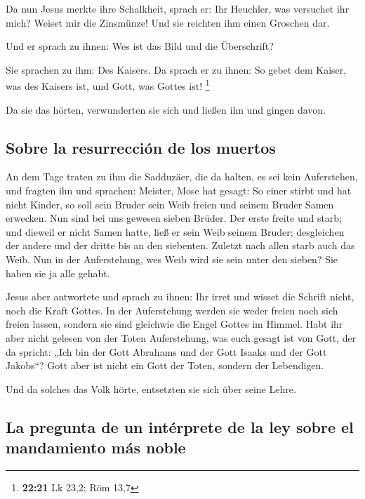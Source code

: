  Da nun Jesus merkte ihre Schalkheit, sprach er: Ihr
Heuchler, was versuchet ihr mich?  Weiset mir die
Zinsmünze! Und sie reichten ihm einen Groschen dar.

 Und er sprach zu ihnen: Wes ist das Bild und die
Überschrift?

 Sie sprachen zu ihm: Des Kaisers. Da sprach er zu ihnen:
So gebet dem Kaiser, was des Kaisers ist, und Gott, was Gottes ist!
\footnote{\textbf{22:21} Lk 23,2; Röm 13,7}

 Da sie das hörten, verwunderten sie sich und ließen ihn
und gingen davon.

\hypertarget{sobre-la-resurrecciuxf3n-de-los-muertos}{%
\subsection{Sobre la resurrección de los
muertos}\label{sobre-la-resurrecciuxf3n-de-los-muertos}}

 An dem Tage traten zu ihm die Sadduzäer, die da halten,
es sei kein Auferstehen, und fragten ihn  und sprachen:
Meister, Mose hat gesagt: So einer stirbt und hat nicht Kinder, so soll
sein Bruder sein Weib freien und seinem Bruder Samen erwecken.
 Nun sind bei uns gewesen sieben Brüder. Der erste freite
und starb; und dieweil er nicht Samen hatte, ließ er sein Weib seinem
Bruder;  desgleichen der andere und der dritte bis an den
siebenten.  Zuletzt nach allen starb auch das Weib.
 Nun in der Auferstehung, wes Weib wird sie sein unter
den sieben? Sie haben sie ja alle gehabt.

 Jesus aber antwortete und sprach zu ihnen: Ihr irret und
wisset die Schrift nicht, noch die Kraft Gottes.  In der
Auferstehung werden sie weder freien noch sich freien lassen, sondern
sie sind gleichwie die Engel Gottes im Himmel.  Habt ihr
aber nicht gelesen von der Toten Auferstehung, was euch gesagt ist von
Gott, der da spricht:  „Ich bin der Gott Abrahams und der
Gott Isaaks und der Gott Jakobs``? Gott aber ist nicht ein Gott der
Toten, sondern der Lebendigen.

 Und da solches das Volk hörte, entsetzten sie sich über
seine Lehre.

\hypertarget{la-pregunta-de-un-intuxe9rprete-de-la-ley-sobre-el-mandamiento-muxe1s-noble}{%
\subsection{La pregunta de un intérprete de la ley sobre el mandamiento
más
noble}\label{la-pregunta-de-un-intuxe9rprete-de-la-ley-sobre-el-mandamiento-muxe1s-noble}}

